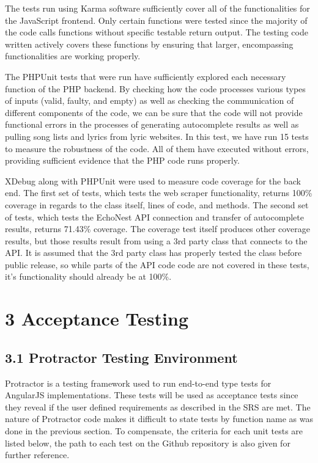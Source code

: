 \documentclass[]{article}
\begin{document}
The tests run using Karma software sufficiently cover all of the
functionalities for the JavaScript frontend. Only certain functions were
tested since the majority of the code calls functions without specific
testable return output. The testing code written actively covers these
functions by ensuring that larger, encompassing functionalities are
working properly.

The PHPUnit tests that were run have sufficiently explored each
necessary function of the PHP backend. By checking how the code
processes various types of inputs (valid, faulty, and empty) as well as
checking the communication of different components of the code, we can
be sure that the code will not provide functional errors in the
processes of generating autocomplete results as well as pulling song
lists and lyrics from lyric websites. In this test, we have run 15 tests
to measure the robustness of the code. All of them have executed without
errors, providing sufficient evidence that the PHP code runs properly.

XDebug along with PHPUnit were used to measure code coverage for the
back end. The first set of tests, which tests the web scraper
functionality, returns 100\% coverage in regards to the class itself,
lines of code, and methods. The second set of tests, which tests the
EchoNest API connection and transfer of autocomplete results, returns
71.43\% coverage. The coverage test itself produces other coverage
results, but those results result from using a 3rd party class that
connects to the API. It is assumed that the 3rd party class has properly
tested the class before public release, so while parts of the API code
code are not covered in these tests, it's functionality should already
be at 100\%.

\section{\textbf{3 Acceptance Testing}}\label{acceptance-testing}

\subsection{\textbf{3.1 Protractor Testing
Environment}}\label{protractor-testing-environment}

Protractor is a testing framework used to run end-to-end type tests for
AngularJS implementations. These tests will be used as acceptance tests
since they reveal if the user defined requirements as described in the
SRS are met. The nature of Protractor code makes it difficult to state
tests by function name as was done in the previous section. To
compensate, the criteria for each unit tests are listed below, the path
to each test on the Github repository is also given for further
reference.
\end{document}
